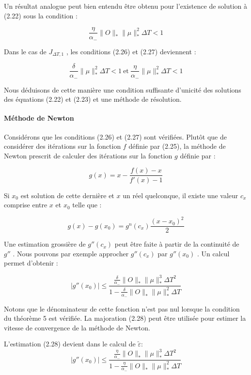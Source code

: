 Un résultat analogue peut bien entendu être obtenu pour l'existence de solution à (2.22) sous la condition :

\begin{equation}
\frac{\eta}{\alpha_-} \lVert O\rVert_* \lVert \mu \rVert _*^2 \Delta T < 1
\end{equation}

Dans le cas de $J_{\Delta T,1}$ , les conditions (2.26) et (2.27) deviennent :

$$ \frac{\delta}{\alpha_-} \lVert \mu \rVert _*^2 \Delta T <1 \ \text{et}\  \frac{\eta}{\alpha_-} \lVert \mu \rVert _*^2 \Delta T <1 $$

Nous déduisons de cette manière une condition suffisante d'unicité des solutions des équations (2.22) et (2.23) et une méthode de résolution.

\paragraph*{Méthode de Newton}
$ $\\
Considérons que les conditions (2.26) et (2.27) sont vérifiées. Plutôt que de considérer des itérations sur la fonction $f$ définie par (2.25), la méthode de Newton prescrit de calculer des itérations sur la fonction $g$ définie par :

$$ g(x) = x -\frac{f(x) - x}{f'(x) - 1} $$

Si $x_0$ est solution de cette dernière et $x$ un réel quelconque, il existe une valeur $c_x$ comprise entre $x$ et $x_0$ telle que :

$$ g(x)-g(x_0) = g^n(c_x) \frac{(x-x_0)^2}{2} $$

Une estimation grossière de $g''(c_x)$ peut être faite à partir de la continuité de $g''$ . Nous pouvons par exemple approcher $g''(c_x)$  par $g''(x_0)$  . Un calcul permet d'obtenir :

\begin{equation}
|g''(x_0)| \leq \frac{\frac{\delta}{\alpha_-} \lVert O\rVert_* \lVert \mu \rVert _*^3 \Delta T^2 }{1-\frac{\delta}{\alpha_-} \lVert O\rVert_* \lVert \mu \rVert _*^2 \Delta T}
\end{equation}

Notons que le dénominateur de cette fonction n'est pas nul lorsque la condition du théorème 5 est vérifiée. La majoration (2.28) peut être utilisée pour estimer la vitesse de convergence de la méthode de Newton.

L'estimation (2.28) devient dans le calcul de $\tilde{\varepsilon}$:
\begin{equation}
|g''(x_0)| \leq \frac{\frac{\eta}{\alpha_-} \lVert O\rVert_* \lVert \mu \rVert _*^3 \Delta T^2 }{1-\frac{\eta}{\alpha_-} \lVert O\rVert_* \lVert \mu \rVert _*^2 \Delta T}
\end{equation}

